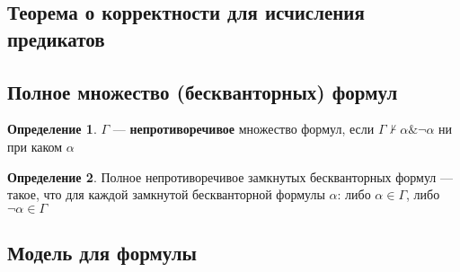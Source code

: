 \documentclass[english]{article}
\theoremstyle{plain}
\theoremstyle{remark}
\theoremstyle{definition}
\newtheorem*{definition}{Определение}
\begin{document}
\subsection{Теорема о корректности для исчисления предикатов}
\label{sec:org9a7b325}
\subsection{Полное множество (бескванторных) формул}
\label{sec:orgd162598}
\begin{definition}
\(\Gamma\) --- \textbf{непротиворечивое} множество формул, если \(\Gamma \not\vdash \alpha \& \neg \alpha\) ни при каком \(\alpha\)
\label{org29c9e0d}
\end{definition}
\begin{definition}
Полное непротиворечивое замкнутых бескванторных формул --- такое, что для каждой замкнутой бескванторной формулы \(\alpha\): либо \(\alpha \in \Gamma\), либо \(\neg \alpha \in \Gamma\)
\label{orgb7be559}
\end{definition}
\subsection{Модель для формулы}
\label{sec:orgf4b8074}
\end{document}
